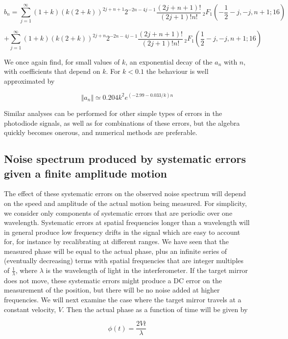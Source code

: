 \documentclass{article}
\begin{document}
\[
b_{n}=\sum_{j=1}^{\infty}(1+k)(k(2+k))^{2j+n+1}2^{-2n-4j-1}\frac{(2j+n+1)!}{(2j+1)!n!}\,_{2}F_{1}\left(-\frac{1}{2}-j,-j,n+1;16\right)
\]


\begin{equation}
+\sum_{j=1}^{\infty}(1+k)(k(2+k))^{2j+n}2^{-2n-4j-1}\frac{(2j+n+1)!}{(2j+1)!n!}\,_{2}F_{1}\left(\frac{1}{2}-j,-j,n+1;16\right)
\end{equation}


We once again find, for small values of $k$, an exponential decay
of the $a_{n}$ with $n$, with coefficients that depend on $k$.
For $k<0.1$ the behaviour is well approximated by

\begin{equation}
\Vert a_{n}\Vert\simeq0.204k^{2}e^{(-2.99-0.033/k)n}
\end{equation}


Similar analyses can be performed for other simple types of errors
in the photodiode signals, as well as for combinations of these errors,
but the algebra quickly becomes onerous, and numerical methods are
preferable.


\subsection{Noise spectrum produced by systematic errors given a finite amplitude
motion}

The effect of these systematic errors on the observed noise spectrum
will depend on the speed and amplitude of the actual motion being
measured. For simplicity, we consider only components of systematic
errors that are periodic over one wavelength. Systematic errors at
spatial frequencies longer than a wavelength will in general produce
low frequency drifts in the signal which are easy to account for,
for instance by recalibrating at different ranges. We have seen that
the measured phase will be equal to the actual phase, plus an infinite
series of (eventually decreasing) terms with spatial frequencies that
are integer multiples of $\frac{1}{\lambda}$, where $\lambda$ is
the wavelength of light in the interferometer. If the target mirror
does not move, these systematic errors might produce a DC error on
the measurement of the position, but there will be no noise added
at higher frequencies. We will next examine the case where the target
mirror travels at a constant velocity, $V$. Then the actual phase
as a function of time will be given by

\[
\phi\left(t\right)=\frac{2Vt}{\lambda}
\]
\end{document}
